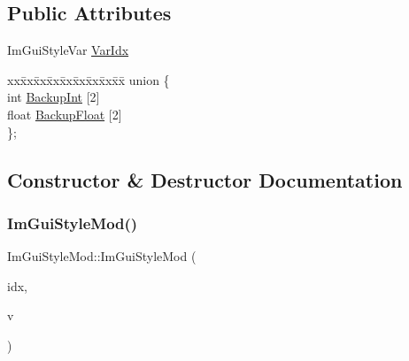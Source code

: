 \subsection*{Public Attributes}
\begin{DoxyCompactItemize}
\item 
Im\+Gui\+Style\+Var \hyperlink{structImGuiStyleMod_ab23c55941dbd0e156ce640a8fecb2feb}{Var\+Idx}
\item 
\begin{tabbing}
xx\=xx\=xx\=xx\=xx\=xx\=xx\=xx\=xx\=\kill
union \{\\
\>int \hyperlink{structImGuiStyleMod_a60491c95989b2a866ebb76403a562f6f}{BackupInt} \mbox{[}2\mbox{]}\\
\>float \hyperlink{structImGuiStyleMod_af36b5cf1100de970d78a53db937be949}{BackupFloat} \mbox{[}2\mbox{]}\\
\}; \\

\end{tabbing}\end{DoxyCompactItemize}


\subsection{Constructor \& Destructor Documentation}
\mbox{\label{structImGuiStyleMod_ae9987273b247f021020034256364bec8}} 
\subsubsection{\texorpdfstring{Im\+Gui\+Style\+Mod()}{ImGuiStyleMod()}\hspace{0.1cm}{\footnotesize\ttfamily [1/3]}}
{\footnotesize\ttfamily Im\+Gui\+Style\+Mod\+::\+Im\+Gui\+Style\+Mod (\begin{DoxyParamCaption}\item[{Im\+Gui\+Style\+Var}]{idx,  }\item[{int}]{v }\end{DoxyParamCaption})\hspace{0.3cm}{\ttfamily [inline]}}

\mbox{\label{structImGuiStyleMod_a737c3fad802a8d5d4616f9decc7e402d}} 
